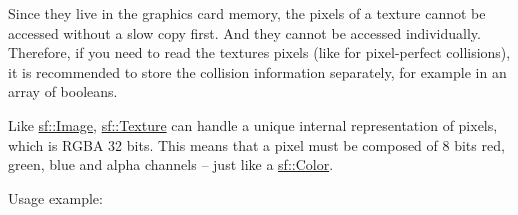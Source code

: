 Since they live in the graphics card memory, the pixels of a texture cannot be accessed without a slow copy first. And they cannot be accessed individually. Therefore, if you need to read the texture\textquotesingle{}s pixels (like for pixel-\/perfect collisions), it is recommended to store the collision information separately, for example in an array of booleans.

Like \mbox{\hyperlink{classsf_1_1_image}{sf\+::\+Image}}, \mbox{\hyperlink{classsf_1_1_texture}{sf\+::\+Texture}} can handle a unique internal representation of pixels, which is R\+G\+BA 32 bits. This means that a pixel must be composed of 8 bits red, green, blue and alpha channels -- just like a \mbox{\hyperlink{classsf_1_1_color}{sf\+::\+Color}}.

Usage example\+: 
\begin{DoxyCode}{0}
\DoxyCodeLine{\textcolor{comment}{// This example shows the most common use of sf::Texture:}}
\DoxyCodeLine{\textcolor{comment}{// drawing a sprite}}
\DoxyCodeLine{}
\DoxyCodeLine{\textcolor{comment}{// Load a texture from a file}}
\DoxyCodeLine{}
\DoxyCodeLine{\textcolor{comment}{// Assign it to a sprite}}
\DoxyCodeLine{}
\DoxyCodeLine{\textcolor{comment}{// Draw the textured sprite}}
\end{DoxyCode}



